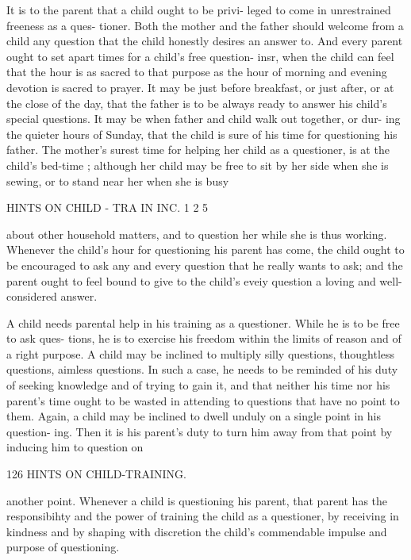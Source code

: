 \documentclass[
]{book}
\begin{document}
It is to the parent that a child ought to be privi- leged to come in unrestrained freeness as a ques- tioner. Both the mother and the father should welcome from a child any question that the child honestly desires an answer to. And every parent ought to set apart times for a child's free question- insr, when the child can feel that the hour is as sacred to that purpose as the hour of morning and evening devotion is sacred to prayer. It may be just before breakfast, or just after, or at the close of the day, that the father is to be always ready to answer his child's special questions. It may be when father and child walk out together, or dur- ing the quieter hours of Sunday, that the child is sure of his time for questioning his father. The mother's surest time for helping her child as a questioner, is at the child's bed-time ; although her child may be free to sit by her side when she is sewing, or to stand near her when she is busy

HINTS ON CHILD - TRA IN INC. 1 2 5

about other household matters, and to question her while she is thus working. Whenever the child's hour for questioning his parent has come, the child ought to be encouraged to ask any and every question that he really wants to ask; and the parent ought to feel bound to give to the child's eveiy question a loving and well-considered answer.

A child needs parental help in his training as a questioner. While he is to be free to ask ques- tions, he is to exercise his freedom within the limits of reason and of a right purpose. A child may be inclined to multiply silly questions, thoughtless questions, aimless questions. In such a case, he needs to be reminded of his duty of seeking knowledge and of trying to gain it, and that neither his time nor his parent's time ought to be wasted in attending to questions that have no point to them. Again, a child may be inclined to dwell unduly on a single point in his question- ing. Then it is his parent's duty to turn him away from that point by inducing him to question on

126 HINTS ON CHILD-TRAINING.

another point. Whenever a child is questioning his parent, that parent has the responsibihty and the power of training the child as a questioner, by receiving in kindness and by shaping with discretion the child's commendable impulse and purpose of questioning.
\end{document}
